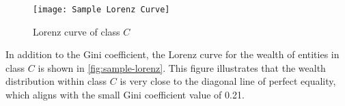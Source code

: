 \begin{figure}[!htbp]
    \centering
    \texttt{[image: Sample Lorenz Curve]}
    \caption{Lorenz curve of class \(C\)} \label{fig:sample-lorenz}
\end{figure}

In addition to the Gini coefficient, the Lorenz curve for the wealth of entities in class \(C\) is shown in \autoref{fig:sample-lorenz}. This figure illustrates that the wealth distribution within class \(C\) is very close to the diagonal line of perfect equality, which aligns with the small Gini coefficient value of 0.21.